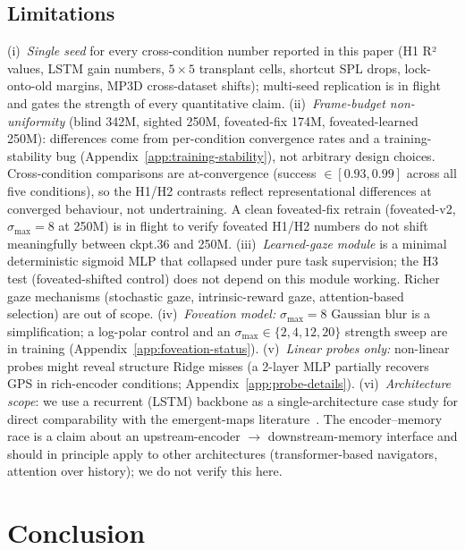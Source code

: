 \documentclass{article}
\newcommand{\uncertain}[1]{{\color{uncertaincol}#1}}
\begin{document}
\subsection{Limitations}
\label{sec:limitations}

(i)~\emph{Single seed} for every cross-condition number reported in this paper (H1 R² values, LSTM gain numbers, $5{\times}5$ transplant cells, shortcut SPL drops, lock-onto-old margins, MP3D cross-dataset shifts); multi-seed replication is in flight and gates the strength of every quantitative claim. (ii)~\emph{Frame-budget non-uniformity} (blind 342M, sighted 250M, foveated-fix 174M, foveated-learned 250M): differences come from per-condition convergence rates and a training-stability bug (Appendix~\ref{app:training-stability}), not arbitrary design choices. Cross-condition comparisons are at-convergence (success $\in [0.93, 0.99]$ across all five conditions), so the H1/H2 contrasts reflect representational differences at converged behaviour, not undertraining. \uncertain{A clean foveated-fix retrain (foveated-v2, $\sigma_{\max}=8$ at 250M) is in flight to verify foveated H1/H2 numbers do not shift meaningfully between ckpt.36 and 250M.} (iii)~\emph{Learned-gaze module} is a minimal deterministic sigmoid MLP that collapsed under pure task supervision; the H3 test (foveated-shifted control) does not depend on this module working. Richer gaze mechanisms (stochastic gaze, intrinsic-reward gaze, attention-based selection) are out of scope. (iv)~\emph{Foveation model:} $\sigma_{\max}=8$ Gaussian blur is a simplification; a log-polar control and an $\sigma_{\max}\in\{2,4,12,20\}$ strength sweep are in training (Appendix~\ref{app:foveation-status}). (v)~\emph{Linear probes only:} non-linear probes might reveal structure Ridge misses (a 2-layer MLP partially recovers GPS in rich-encoder conditions; Appendix~\ref{app:probe-details}). (vi)~\emph{Architecture scope}: we use a recurrent (LSTM) backbone as a single-architecture case study for direct comparability with the emergent-maps literature~\citep{wijmans2023emergence,banino2018grid,cueva2018grid}. The encoder--memory race is a claim about an upstream-encoder $\to$ downstream-memory interface and should in principle apply to other architectures (transformer-based navigators, attention over history); we do not verify this here.


\section{Conclusion}
\end{document}
